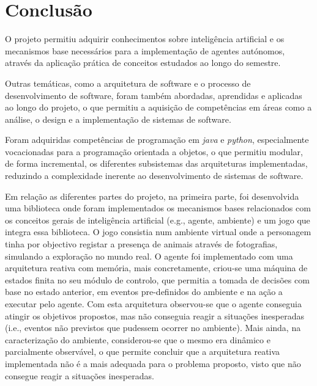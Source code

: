 \chapter{Conclusão}\label{ch:conclusao}

O projeto permitiu adquirir conhecimentos sobre inteligência artificial e os mecanismos base necessários para a implementação de agentes autónomos, através da aplicação prática de conceitos estudados ao longo do semestre.

Outras temáticas, como a arquitetura de software e o processo de desenvolvimento de software, foram também abordadas, aprendidas e aplicadas ao longo do projeto, o que permitiu a aquisição de competências em áreas como a análise, o design e a implementação de sistemas de software.

Foram adquiridas competências de programação em \textit{java} e \textit{python}, especialmente vocacionadas para a programação orientada a objetos, o que permitiu modular, de forma incremental, os diferentes subsistemas das arquiteturas implementadas, reduzindo a complexidade inerente ao desenvolvimento de sistemas de software.

Em relação as diferentes partes do projeto, na primeira parte, foi desenvolvida uma biblioteca onde foram implementados os mecanismos bases relacionados com os conceitos gerais de inteligência artificial (e.g., agente, ambiente) e um jogo que integra essa biblioteca.
O jogo consistia num ambiente virtual onde a personagem tinha por objectivo registar a presença de animais através de fotografias, simulando a exploração no mundo real.
O agente foi implementado com uma arquitetura reativa com memória, mais concretamente, criou-se uma máquina de estados finita no seu módulo de controlo, que permitia a tomada de decisões com base no estado anterior, em eventos pre-definidos do ambiente e na ação a executar pelo agente.
Com esta arquitetura observou-se que o agente conseguia atingir os objetivos propostos, mas não conseguia reagir a situações inesperadas (i.e., eventos não previstos que pudessem ocorrer no ambiente).
Mais ainda, na caracterização do ambiente, considerou-se que o mesmo era dinâmico e parcialmente observável, o que permite concluir que a arquitetura reativa implementada não é a mais adequada para o problema proposto, visto que não consegue reagir a situações inesperadas.

